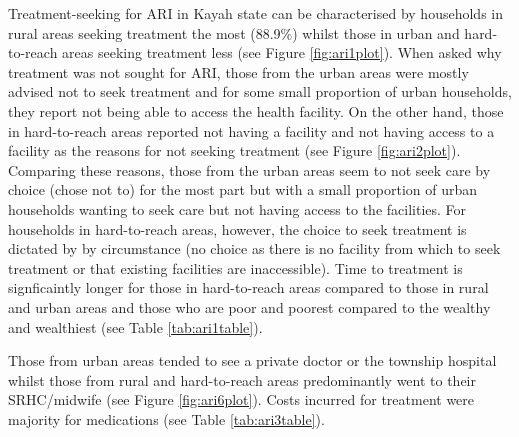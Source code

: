 \documentclass[12pt,a4paper]{article}
\begin{document}
Treatment-seeking for ARI in Kayah state can be characterised by households in rural areas seeking treatment the most (88.9\%) whilst those in urban and hard-to-reach areas seeking treatment less (see Figure \ref{fig:ari1plot}). When asked why treatment was not sought for ARI, those from the urban areas were mostly advised not to seek treatment and for some small proportion of urban households, they report not being able to access the health facility. On the other hand, those in hard-to-reach areas reported not having a facility and not having access to a facility as the reasons for not seeking treatment (see Figure \ref{fig:ari2plot}). Comparing these reasons, those from the urban areas seem to not seek care by choice (chose not to) for the most part but with a small proportion of urban households wanting to seek care but not having access to the facilities. For households in hard-to-reach areas, however, the choice to seek treatment is dictated by by circumstance (no choice as there is no facility from which to seek treatment or that existing facilities are inaccessible). Time to treatment is signficaintly longer for those in hard-to-reach areas compared to those in rural and urban areas and those who are poor and poorest compared to the wealthy and wealthiest (see Table \ref{tab:ari1table}).

Those from urban areas tended to see a private doctor or the township hospital whilst those from rural and hard-to-reach areas predominantly went to their SRHC/midwife (see Figure \ref{fig:ari6plot}). Costs incurred for treatment were majority for medications (see Table \ref{tab:ari3table}).
\end{document}
